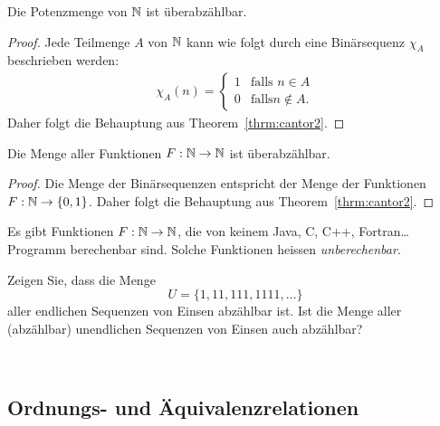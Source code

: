 \begin{cor}
Die Potenzmenge von $\mathbb{N}$ ist überabzählbar.
\end{cor}
\begin{proof}
Jede Teilmenge $A$ von $\mathbb{N}$ kann wie folgt durch eine Binärsequenz $\chi_A$ beschrieben werden:
\begin{align*}
\chi_A(n)=\begin{cases}
1&\text{falls } n\in A\\
0&\text{falls} n\notin A.
\end{cases}
\end{align*}
Daher folgt die Behauptung aus Theorem~\ref{thrm:cantor2}.
\end{proof}

\begin{cor}
Die Menge aller Funktionen $F:\mathbb{N}\to\mathbb{N}$ ist überabzählbar.
\end{cor}
\begin{proof}
Die Menge der Binärsequenzen entspricht der Menge der Funktionen $F:\mathbb{N}\to\{0,1\}$. Daher folgt die Behauptung aus Theorem~\ref{thrm:cantor2}.
\end{proof}

\begin{cor}
Es gibt Funktionen $F:\mathbb{N}\to\mathbb{N}$, die von keinem Java, C, C++, Fortran\dots Programm berechenbar sind. Solche Funktionen heissen \textit{unberechenbar}.
\end{cor}


\begin{ueb}
Zeigen Sie, dass die Menge
\[
U=\{1,11,111,1111,\dots \}
\]
aller endlichen Sequenzen von Einsen abzählbar ist. Ist die Menge aller (abzählbar) unendlichen Sequenzen von Einsen auch abzählbar?
\end{ueb}
\begin{lsg}
{~\answerspace{2cm}}
\end{lsg}

\subsection{Ordnungs- und Äquivalenzrelationen}

